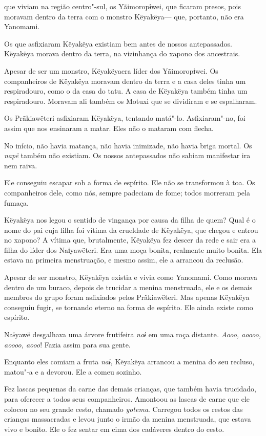  

 que viviam na região centro"-sul, os
Yãimoropɨwei, que ficaram presos, pois moravam dentro da terra com o
monstro Këyakëya--- que, portanto, não era Yanomami. 

Os que asfixiaram Këyakëya existiam bem antes de nossos antepassados.
Këyakëya morava dentro da terra, na vizinhança do xapono dos
ancestrais. 

Apesar de ser um monstro, Këyakëyaera líder dos Yãimoropɨwei. Os
companheiros de Këyakëya moravam dentro da terra e a casa deles tinha um
respiradouro, como o da casa do tatu. A casa de Këyakëya também tinha um
respiradouro. Moravam ali também os Motuxi que se dividiram e se
espalharam. 

Os Prãkiawëteri asfixiaram Këyakëya, tentando matá"-lo. Asfixiaram"-no,
foi assim que nos ensinaram a matar. Eles não o mataram com flecha. 

No início, não havia matança, não havia inimizade, não havia briga
mortal. Os \emph{napë} também não existiam. Os nossos antepassados não
sabiam manifestar ira nem raiva. 

Ele conseguiu escapar sob a forma de espírito. Ele não se transformou à
toa. Os companheiros dele, como nós, sempre padeciam de fome; todos
morreram pela fumaça. 

Këyakëya nos legou o sentido de vingança por causa da filha de quem?
Qual é o nome do pai cuja filha foi vítima da crueldade de Këyakëya, que
chegou e entrou no xapono? A vítima que, brutalmente, Këyakëya fez
descer da rede e sair era a filha do líder dos Naɨyawëteri. Era uma moça
bonita, realmente muito bonita. Ela estava na primeira menstruação, e
mesmo assim, ele a arrancou da reclusão.

Apesar de ser monstro, Këyakëya existia e vivia como Yanomami. Como
morava dentro de um buraco, depois de trucidar a menina menstruada, ele
e os demais membros do grupo foram asfixiados pelos Prãkiawëteri. Mas
apenas Këyakëya conseguiu fugir, se tornando eterno na forma de
espírito. Ele ainda existe como espírito. 

Naɨyawë desgalhava uma árvore frutifeira \emph{naɨ} em uma roça
distante\emph{. Aooo, aoooo, aoooo, aooo}! Fazia assim para sua gente. 

Enquanto eles comiam a fruta \emph{naɨ}, Këyakëya arrancou a menina do
seu recluso, matou"-a e a devorou. Ele a comeu sozinho. 

Fez lascas pequenas da carne das demais crianças, que também havia
trucidado, para oferecer a todos seus companheiros. Amontoou as lascas de
carne que ele colocou no seu grande cesto, chamado \emph{yotema}.
Carregou todos os restos das crianças massacradas e levou junto o irmão
da menina menstruada, que estava vivo e bonito. Ele o fez sentar em cima
dos cadáveres dentro do cesto. 

